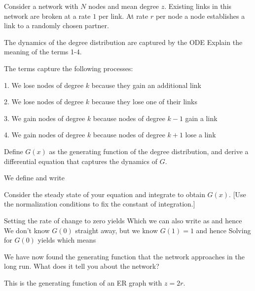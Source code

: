 Consider a network with $N$ nodes and mean degree $z$. Existing links in this network are broken at a rate $1$ per link. At rate $r$ per node a node establishes a link to a randomly chosen partner. 

\subquestion
The dynamics of the degree distribution are captured by the ODE
Explain the meaning of the terms 1-4.

\solution 
The terms capture the following processes:

 1. We lose nodes of degree $k$ because they gain an additional link
 
 2. We lose nodes of degree $k$ because they lose one of their links
 
 3.  We gain nodes of degree $k$ because nodes of degree $k-1$ gain a link
 
 4. We gain nodes of degree $k$ because nodes of degree $k+1$ lose a link

\subquestion
Define $G(x)$ as the generating function of the degree distribution, and derive a differential equation that captures the dynamics of $G$.

\solution
We define
and write 

\subquestion
Consider the steady state of your equation and integrate to obtain $G(x)$. [Use the normalization conditions to fix the constant of integration.] 

\solution
Setting the rate of change to zero yields
Which we can also write as 
and hence 
We don't know $G(0)$ straight away, but we know $G(1)=1$ and hence
Solving for $G(0)$ yields
which means 

\subquestion 
We have now found the generating function that the network approaches in the long run. What does it tell you about the network?  

\solution
This is the generating function of an ER graph with $z=2r$.
